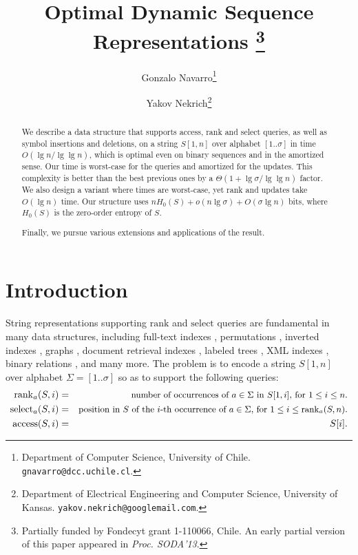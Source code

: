 \documentclass[11pt]{article}
\def\idrm#1{\ensuremath{\mathrm{#1}}}
\newcommand{\no}[1]{}
\newcommand{\ra}{\idrm{rank}}
\newcommand{\sel}{\idrm{select}}
\newcommand{\acc}{\idrm{access}}
\begin{document}
\title{\Large Optimal Dynamic Sequence Representations
\thanks{Partially funded by Fondecyt grant 1-110066, Chile.
An early partial version of this paper appeared in {\em Proc. SODA'13}.}}

\author{
Gonzalo Navarro\thanks{Department of Computer Science, University of Chile.
{\tt  gnavarro@dcc.uchile.cl}.}
\and
Yakov Nekrich\thanks{Department of Electrical Engineering and Computer Science,
University of Kansas.
{\tt yakov.nekrich@googlemail.com}.}
}
\date{}

\maketitle

\begin{abstract} 
We describe a data structure that supports access, rank and select queries,
as well as symbol insertions and deletions, on a string $S[1,n]$ over alphabet 
$[1..\sigma]$ in time $O(\lg n/\lg\lg n)$, which is optimal even on binary
sequences and in the amortized sense. Our time is worst-case for the queries 
and amortized for the updates. This complexity is better than the best previous
ones by a $\Theta(1+\lg\sigma/\lg\lg n)$ factor.
We also design a variant where times are worst-case, yet rank and updates
take $O(\lg n)$ time.
Our structure uses $nH_0(S)+o(n\lg\sigma) + O(\sigma\lg n)$
bits, where $H_0(S)$ is the zero-order entropy of $S$.
\no{Finally, we pursue various extensions, like handling general alphabets
(such as reals and strings) and supporting a more general algebra of string
operations including concatenations, splits, and block edits.}
Finally, we pursue various extensions and applications of the
result.
\end{abstract}

\section{Introduction}
\label{sec:intro}

String representations supporting $\ra$ and $\sel$ queries are fundamental
in many data structures, including 
full-text indexes \cite{GGV03,FMMN07,GMR06}, 
permutations \cite{GMR06,BGNN10}, 
inverted indexes \cite{BFLN08,BGNN10}, 
graphs \cite{CN10},
document retrieval indexes \cite{VM07}, 
labeled trees \cite{GMR06,BHMR07}, 
XML indexes \cite{GHSV07,FLMM09},
binary relations \cite{BHMR07}, 
and many more. 
The problem is to encode a string $S[1,n]$ over alphabet $\Sigma=[1..\sigma]$ 
so as to support the following queries:
\begin{eqnarray*}
\ra_a(S,i) &=& \textrm{\small number of occurrences of $a \in \Sigma$ } 
            \textrm{\small in $S[1,i]$, for $1 \le i \le n$.} \\
\sel_a(S,i) &=& \textrm{\small position in $S$ of the $i$-th occurrence } 
             \textrm{\small of $a \in \Sigma$, for $1 \le i \le \ra_a(S,n)$.} \\
\acc(S,i) &=& S[i].
\end{eqnarray*}
\end{document}
